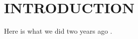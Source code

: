 \section{INTRODUCTION}
\label{sec:hjetscomp:intro}

Here is what we did two years ago \cite{AlcarazMaestre:2012vp}.

